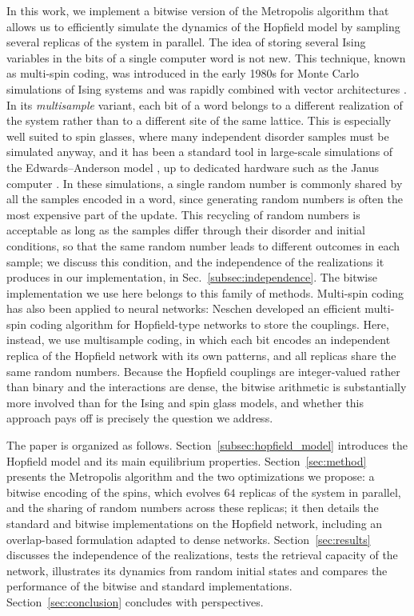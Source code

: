 In this work, we implement a bitwise version of the Metropolis algorithm that allows us to efficiently simulate the dynamics of the Hopfield model by sampling several replicas of the system in parallel. The idea of storing several Ising variables in the bits of a single computer word is not new. This technique, known as multi-spin coding, was introduced in the early 1980s for Monte Carlo simulations of Ising systems \cite{JacobsRebbi1981,Zorn1981} and was rapidly combined with vector architectures \cite{Bhanot1986}. In its \emph{multisample} variant, each bit of a word belongs to a different realization of the system rather than to a different site of the same lattice. This is especially well suited to spin glasses, where many independent disorder samples must be simulated anyway, and it has been a standard tool in large-scale simulations of the Edwards--Anderson model \cite{Ogielski1985,HFreund_1988,palassini1999}, up to dedicated hardware such as the Janus computer \cite{Janus2009}. In these simulations, a single random number is commonly shared by all the samples encoded in a word, since generating random numbers is often the most expensive part of the update. This recycling of random numbers is acceptable as long as the samples differ through their disorder and initial conditions, so that the same random number leads to different outcomes in each sample; we discuss this condition, and the independence of the realizations it produces in our implementation, in Sec.~\ref{subsec:independence}. The bitwise implementation we use here belongs to this family of methods. Multi-spin coding has also been applied to neural networks: Neschen \cite{Neschen1991} developed an efficient multi-spin coding algorithm for Hopfield-type networks to store the couplings. Here, instead, we use multisample coding, in which each bit encodes an independent replica of the Hopfield network with its own patterns, and all replicas share the same random numbers. Because the Hopfield couplings are integer-valued rather than binary and the interactions are dense, the bitwise arithmetic is substantially more involved than for the Ising and spin glass models, and whether this approach pays off is precisely the question we address.

The paper is organized as follows.
Section~\ref{subsec:hopfield_model} introduces the Hopfield model and its main equilibrium properties. Section~\ref{sec:method} presents the Metropolis algorithm and the two optimizations we propose: a bitwise encoding of the spins, which evolves $64$ replicas of the system in parallel, and the sharing of random numbers across these replicas; it then details the standard and bitwise implementations on the Hopfield network, including an overlap-based formulation adapted to dense networks. Section~\ref{sec:results} discusses the independence of the realizations, tests the retrieval capacity of the network, illustrates its dynamics from random initial states and compares the performance of the bitwise and standard implementations. Section~\ref{sec:conclusion} concludes with perspectives.
